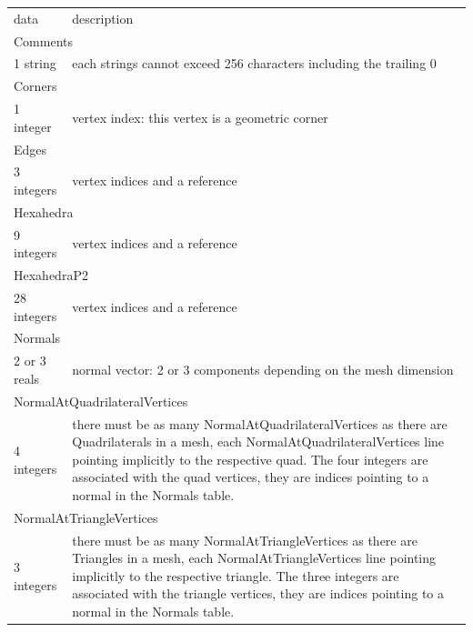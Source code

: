 \documentclass[a4paper,12pt]{article}
\begin{document}
\setlongtables
\begin{longtable}{|m{4cm}|m{11cm}|}
\endhead
\endfoot

\hline
\multicolumn{2}{|l|}{keyword} \\
\hline
data & description \\
\hline\hline

\multicolumn{2}{|l|}{Comments} \\
\hline
1 string & each strings cannot exceed 256 characters including the trailing 0 \\
\hline\hline

\multicolumn{2}{|l|}{Corners} \\
\hline
1 integer & vertex index: this vertex is a geometric corner \\
\hline\hline

\multicolumn{2}{|l|}{Edges} \\
\hline
3 integers & vertex indices and a reference \\
\hline\hline

\multicolumn{2}{|l|}{Hexahedra} \\
\hline
9 integers & vertex indices and a reference \\
\hline\hline

\multicolumn{2}{|l|}{HexahedraP2} \\
\hline
28 integers & vertex indices and a reference \\
\hline\hline

\multicolumn{2}{|l|}{Normals} \\
\hline
2 or 3 reals & normal vector: 2 or 3 components depending on the mesh dimension \\
\hline\hline

\multicolumn{2}{|l|}{NormalAtQuadrilateralVertices} \\
\hline
4 integers & there must be as many NormalAtQuadrilateralVertices as there are Quadrilaterals in a mesh, each NormalAtQuadrilateralVertices line pointing implicitly to the respective quad. The four integers are associated with the quad vertices, they are indices pointing to a normal in the Normals table. \\
\hline\hline

\multicolumn{2}{|l|}{NormalAtTriangleVertices} \\
\hline
3 integers & there must be as many NormalAtTriangleVertices as there are Triangles in a mesh, each NormalAtTriangleVertices line pointing implicitly to the respective triangle. The three integers are associated with the triangle vertices, they are indices pointing to a normal in the Normals table. \\
\hline\hline


\end{longtable}
\end{document}
